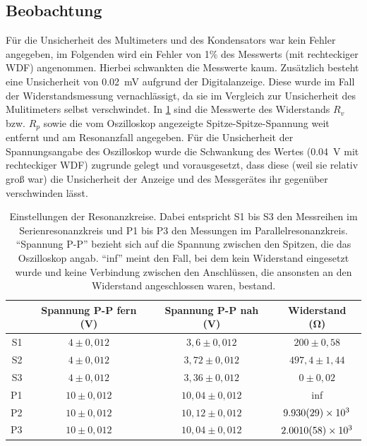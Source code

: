 \documentclass[
	a4paper,
	12pt,
	pagesize,
	ngerman
]{scrartcl}
\begin{document}
	\subsection{Beobachtung}
	Für die Unsicherheit des Multimeters und des Kondensators war kein Fehler angegeben, im Folgenden wird ein Fehler von 1\% des Messwerts (mit rechteckiger WDF) angenommen. %
	Hierbei schwankten die Messwerte kaum.
	Zusätzlich besteht eine Unsicherheit von \SI{0,02}{mV} aufgrund der Digitalanzeige.
	Diese wurde im Fall der Widerstandsmessung vernachlässigt, da sie im Vergleich zur Unsicherheit des Mulitimeters selbst verschwindet.
	In \cref{Grundwerte} sind die Messwerte des Widerstands $R_v$ bzw. $R_p$ sowie die vom Oszilloskop angezeigte Spitze-Spitze-Spannung weit entfernt und am Resonanzfall angegeben. %
	Für die Unsicherheit der Spannungsangabe des Oszilloskop wurde die Schwankung des Wertes (\SI{0,04}{\volt} mit rechteckiger WDF) zugrunde gelegt und vorausgesetzt, dass diese (weil sie relativ groß war) die Unsicherheit der Anzeige und des Messgerätes ihr gegenüber verschwinden lässt.
	\begin{table}[tb]
		\centering
		\begin{tabular}{ r | c | c | c }
			& Spannung P-P fern (\si{\volt}) & Spannung P-P nah (\si{\volt}) & Widerstand (\si{\ohm})\\ \hline 
			S1& $4 \pm 0,012 $ & $3,6 \pm 0,012 $& $200 \pm 0,58$ \\ 
			S2& $4 \pm 0,012 $ & $3,72 \pm 0,012 $ & $497,4 \pm 1,44$ \\
			S3& $4 \pm 0,012 $ & $3,36 \pm 0,012 $ & $ 0 \pm 0,02 $\\
			P1& $ 10 \pm 0,012 $ & $10,04 \pm 0,012 $ & inf\\
			P2& $ 10 \pm 0,012 $ & $10,12 \pm 0,012 $ & $ \SI{9,93 \pm 0,029 e3}{} $\\
			P3& $ 10 \pm 0,012 $ & $10,04 \pm 0,012 $ & $ \SI{2,001 \pm 0,0058 e3}{} $\\
		\end{tabular}
		\caption{Einstellungen der Resonanzkreise. Dabei entspricht S1 bis S3 den Messreihen im Serienresonanzkreis und P1 bis P3 den Messungen im Parallelresonanzkreis. \enquote{Spannung P-P} bezieht sich auf die Spannung zwischen den Spitzen, die das Oszilloskop angab. \enquote{inf} meint den Fall, bei dem kein Widerstand eingesetzt wurde und keine Verbindung zwischen den Anschlüssen, die ansonsten an den Widerstand angeschlossen waren, bestand.}
		\label{Grundwerte} 
	\end{table}
\end{document}
